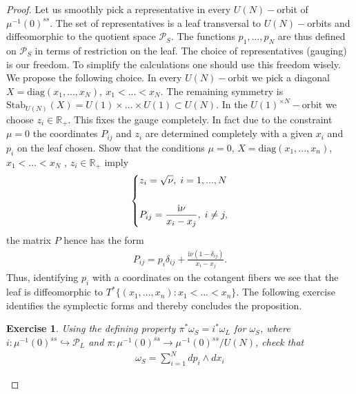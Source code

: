 \documentclass[12pt]{article}
\newtheorem{exer}{Exercise}[section]
\newcommand{\problemname}{}
\newenvironment{statement}[1]
 {\renewcommand{\problemname}{#1}\problem}
 {\endproblem}
\numberwithin{equation}{section}
\theoremstyle{definition}
\newcommand {\ii} {\mathrm{i}}
\begin{document}
\begin{proof}
Let us smoothly pick a representative in every $U(N)-$orbit of $\mu^{-1}(0)^{ss}$. The set of representatives is a leaf transversal to $U(N)-$orbits and diffeomorphic to the quotient space $\mathcal{P}_{S}$. The functions $p_1, ..., p_N$ are thus defined on $\mathcal{P}_{S}$ in terms of restriction on the leaf. The choice of representatives (gauging) is our freedom. To simplify the calculations one should use this freedom wisely. We propose the following choice. In every $U(N)-$orbit we pick a diagonal $X = \mathrm{diag}(x_1, ..., x_N ), ~ x_1 < ... < x_N$.
The remaining symmetry is $\mathrm{Stab}_{U(N)}(X) = U(1) \times ... \times U(1) \subset U(N)$.
In the $U(1)^{\times N}-$orbit we choose $z_i \in \mathbb{R}_{+}$. This fixes the gauge completely. In fact due to the constraint $\mu = 0$ the coordinates $P_{ij}$ and $z_i$ are determined completely with a given $x_i$ and $p_i$ on the leaf chosen.
\begin{statement}{Problem 2}\normalfont\label{prob2}
Show that the conditions $\mu = 0$, $X = \mathrm{diag}(x_1, ..., x_n)$, $x_1 < ... <x_N$ , $z_i \in \mathbb{R}_{+}$ imply
\begin{align*}
\begin{dcases}
        z_i = \sqrt{\nu}, \;i = 1, ..., N\\\\
        P_{ij} = \frac{{\ii}\nu}{x_i - x_j}, \;i \neq j,
    \end{dcases} 
\end{align*}
the matrix $P$ hence has the form
\begin{align}\label{Pmatrix}
    P_{ij} = p_{i} \delta_{ij} + \frac{{\ii}\nu (1 - \delta_{ij})}{x_i - x_j}.
\end{align}
\end{statement}
Thus, identifying $p_i$ with a coordinates on the cotangent fibers we see that the leaf is diffeomorphic to $T^{*}\{(x_1 , ..., x_n ): x_1 < ... < x_n \}$. The following exercise identifies the symplectic forms and thereby concludes the proposition.
\begin{exer}\normalfont
    Using the defining property $\pi^{*}\omega_{S} = i^{*}\omega_{L}$ for $\omega_{S}$, where $i: \mu^{-1}(0)^{ss} \hookrightarrow \mathcal{P}_{L}$ and $\pi: \mu^{-1}(0)^{ss} \rightarrow \mu^{-1}(0)^{ss}/U(N)$, check that
    \begin{align*}
        \omega_{S} = \sum\limits_{i = 1}^{N} d p_{i} \wedge d x_{i}
    \end{align*}
\end{exer}
\end{proof}
\end{document}
